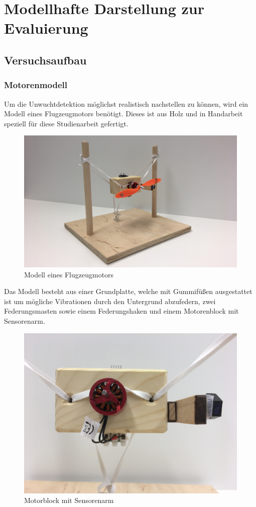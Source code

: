 
\chapter{Modellhafte Darstellung zur Evaluierung}

\section{Versuchsaufbau}

\subsection{Motorenmodell}
Um die Unwuchtdetektion möglichst realistisch nachstellen zu können, wird ein Modell eines Flugzeugmotors benötigt.
Dieses ist aus Holz und in Handarbeit speziell für diese Studienarbeit gefertigt.
\begin{figure}[H]
	\centering
	\includegraphics[width=.9\textwidth]{images/chapter/03/motorenmodell.jpg}
	\caption{Modell eines Flugzeugmotors}
\end{figure}
Das Modell besteht aus einer Grundplatte, welche mit Gummifüßen ausgestattet ist um mögliche Vibrationen durch den Untergrund abzufedern, zwei Federungsmasten sowie einem Federungshaken und einem Motorenblock mit Sensorenarm.
\begin{figure}[H]
	\centering
	\includegraphics[width=.9\textwidth]{images/chapter/03/motorblock_mit_sensor.jpg}
	\caption{Motorblock mit Sensorenarm}
	\label{fig:motorblock_mit_sensorenarm}
\end{figure}
